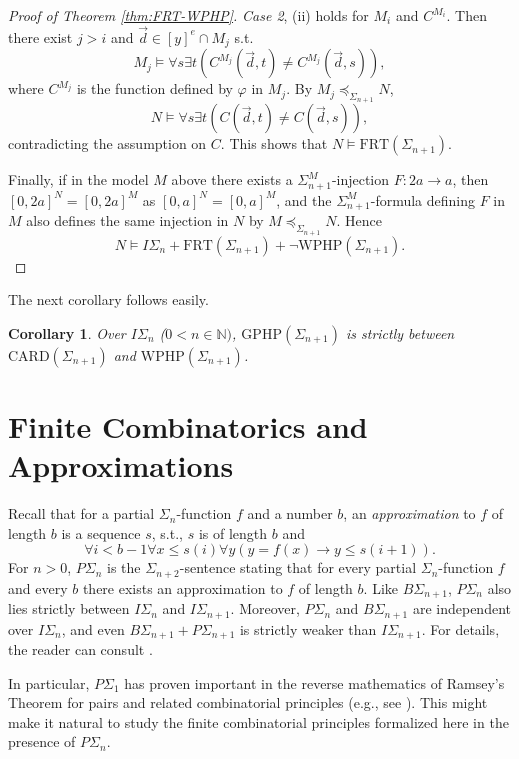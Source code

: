 \documentclass[twoside,a4paper]{amsart}
\newtheorem{corollary}[theorem]{Corollary}
\theoremstyle{definition}
\theoremstyle{theorem}
\numberwithin{equation}{section}
\newcommand{\<}{\langle}
\renewcommand{\>}{\rangle}
\newcommand{\CARD}{\mathrm{CARD}}
\newcommand{\WPHP}{\mathrm{WPHP}}
\newcommand{\GPHP}{\mathrm{GPHP}}
\newcommand{\FRT}{\mathrm{FRT}}
\begin{document}
\begin{proof}[Proof of Theorem \ref{thm:FRT-WPHP}]
\emph{Case 2}, (ii) holds for $M_i$ and $C^{M_i}$.
Then there exist $j > i$ and $\vec{d} \in [y]^e \cap M_j$ s.t.
\[
  M_j \models \forall s \exists t( C^{M_j}(\vec{d},t) \neq C^{M_j}(\vec{d},s) ),
\]
where $C^{M_j}$ is the function defined by $\varphi$ in $M_j$.
By $M_j \preceq_{\Sigma_{n+1}} N$,
\[
  N \models \forall s \exists t( C(\vec{d},t) \neq C(\vec{d},s) ),
\]
contradicting the assumption on $C$.
This shows that $N \models \FRT(\Sigma_{n+1})$.

Finally, if in the model $M$ above there exists a $\Sigma_{n+1}^M$-injection $F: 2a \to a$,
then $[0,2a]^N = [0,2a]^M$ as $[0,a]^N = [0,a]^M$,
and the $\Sigma_{n+1}^M$-formula defining $F$ in $M$ also defines the same injection in $N$ by $M \preceq_{\Sigma_{n+1}} N$.
Hence
\[
  N \models I\Sigma_n + \FRT(\Sigma_{n+1}) + \neg \WPHP(\Sigma_{n+1}).
\]
\end{proof}

The next corollary follows easily.

\begin{corollary}
Over $I\Sigma_{n}$ ($0 < n \in \mathbb{N})$,
$\GPHP(\Sigma_{n+1})$ is strictly between $\CARD(\Sigma_{n+1})$ and $\WPHP(\Sigma_{n+1})$.
\end{corollary}

\section{Finite Combinatorics and Approximations}

Recall that for a partial $\Sigma_n$-function $f$ and a number $b$,
an \emph{approximation} to $f$ of length $b$ is a sequence $s$,
 s.t., $s$ is of length $b$ and
\[
  \forall i < b-1 \forall x \leq s(i) \forall y(y = f(x) \to y \leq s(i+1)).
\]
For $n > 0$, $P\Sigma_{n}$ is the $\Sigma_{n+2}$-sentence stating that for every partial $\Sigma_n$-function $f$ and every $b$ there exists an approximation to $f$ of length $b$.
Like $B\Sigma_{n+1}$, $P\Sigma_n$ also lies strictly between $I\Sigma_n$ and $I\Sigma_{n+1}$.
Moreover, $P\Sigma_n$ and $B\Sigma_{n+1}$ are independent over $I\Sigma_n$, and even $B\Sigma_{n+1} + P\Sigma_{n+1}$ is strictly weaker than $I\Sigma_{n+1}$.
For details, the reader can consult \cite[Chapter IV]{HP:1998.book}.

In particular, $P\Sigma_1$ has proven important in the reverse mathematics of Ramsey's Theorem for pairs and related combinatorial principles (e.g., see \cite{KrYo:2016.JML, CWY:2024.TT, HoPaYo:2025.TAMS}).
This might make it natural to study the finite combinatorial principles formalized here in the presence of $P\Sigma_n$.
\end{document}
